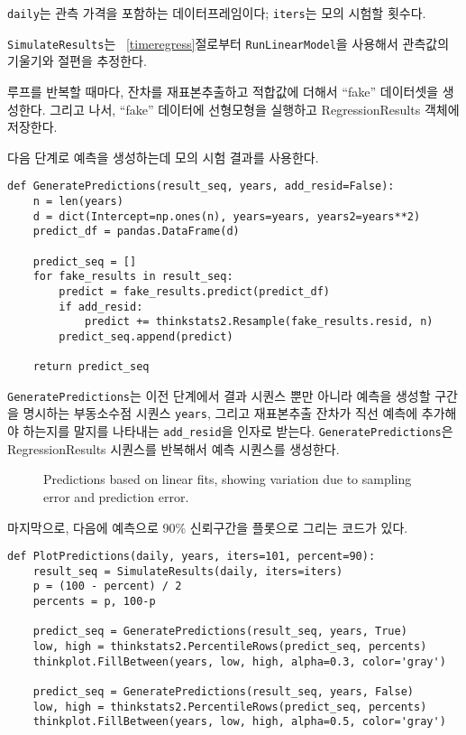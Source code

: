 {\tt daily}는 관측 가격을 포함하는 데이터프레임이다;
{\tt iters}는 모의 시험할 횟수다.

{\tt SimulateResults}는 ~\ref{timeregress}절로부터 {\tt RunLinearModel}을 사용해서 관측값의 기울기와 절편을 추정한다.

루프를 반복할 때마다, 잔차를 재표본추출하고 적합값에 더해서 ``fake'' 데이터셋을 생성한다. 그리고 나서, ``fake'' 데이터에 선형모형을 실행하고 RegressionResults 객체에 저장한다.

다음 단계로 예측을 생성하는데 모의 시험 결과를 사용한다.

\begin{verbatim}
def GeneratePredictions(result_seq, years, add_resid=False):
    n = len(years)
    d = dict(Intercept=np.ones(n), years=years, years2=years**2)
    predict_df = pandas.DataFrame(d)
    
    predict_seq = []
    for fake_results in result_seq:
        predict = fake_results.predict(predict_df)
        if add_resid:
            predict += thinkstats2.Resample(fake_results.resid, n)
        predict_seq.append(predict)

    return predict_seq
\end{verbatim}

{\tt GeneratePredictions}는 이전 단계에서 결과 시퀀스 뿐만 아니라 
예측을 생성할 구간을 명시하는 부동소수점 시퀀스 {\tt years}, 그리고 재표본추출 잔차가 직선 예측에 추가해야 하는지를 말지를 나타내는 \verb"add_resid"을 인자로 받는다.
{\tt GeneratePredictions}은 RegressionResults 시퀀스를 반복해서 예측 시퀀스를 생성한다.

\begin{figure}
\caption{Predictions based on linear fits, showing variation due
to sampling error and prediction error.}
\label{timeseries4}
\end{figure}

마지막으로, 다음에 예측으로 90\% 신뢰구간을 플롯으로 그리는 코드가 있다.

\begin{verbatim}
def PlotPredictions(daily, years, iters=101, percent=90):
    result_seq = SimulateResults(daily, iters=iters)
    p = (100 - percent) / 2
    percents = p, 100-p

    predict_seq = GeneratePredictions(result_seq, years, True)
    low, high = thinkstats2.PercentileRows(predict_seq, percents)
    thinkplot.FillBetween(years, low, high, alpha=0.3, color='gray')

    predict_seq = GeneratePredictions(result_seq, years, False)
    low, high = thinkstats2.PercentileRows(predict_seq, percents)
    thinkplot.FillBetween(years, low, high, alpha=0.5, color='gray')
\end{verbatim}

